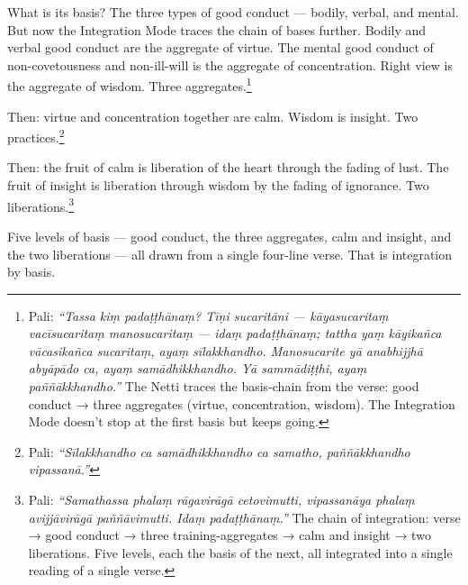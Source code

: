 What is its basis? The three types of good conduct --- bodily, verbal, and mental. But now the Integration Mode traces the chain of bases further. Bodily and verbal good conduct are the aggregate of virtue. The mental good conduct of non-covetousness and non-ill-will is the aggregate of concentration. Right view is the aggregate of wisdom. Three aggregates.\footnote{Pali: \textit{``Tassa kiṃ padaṭṭhānaṃ? Tīṇi sucaritāni --- kāyasucaritaṃ vacīsucaritaṃ manosucaritaṃ --- idaṃ padaṭṭhānaṃ; tattha yaṃ kāyikañca vācasikañca sucaritaṃ, ayaṃ sīlakkhandho. Manosucarite yā anabhijjhā abyāpādo ca, ayaṃ samādhikkhandho. Yā sammādiṭṭhi, ayaṃ paññākkhandho.''} The Netti traces the basis-chain from the verse: good conduct → three aggregates (virtue, concentration, wisdom). The Integration Mode doesn't stop at the first basis but keeps going.}

Then: virtue and concentration together are calm. Wisdom is insight. Two practices.\footnote{Pali: \textit{``Sīlakkhandho ca samādhikkhandho ca samatho, paññākkhandho vipassanā.''}}

Then: the fruit of calm is liberation of the heart through the fading of lust. The fruit of insight is liberation through wisdom by the fading of ignorance. Two liberations.\footnote{Pali: \textit{``Samathassa phalaṃ rāgavirāgā cetovimutti, vipassanāya phalaṃ avijjāvirāgā paññāvimutti. Idaṃ padaṭṭhānaṃ.''} The chain of integration: verse → good conduct → three training-aggregates → calm and insight → two liberations. Five levels, each the basis of the next, all integrated into a single reading of a single verse.}

Five levels of basis --- good conduct, the three aggregates, calm and insight, and the two liberations --- all drawn from a single four-line verse. That is integration by basis.

